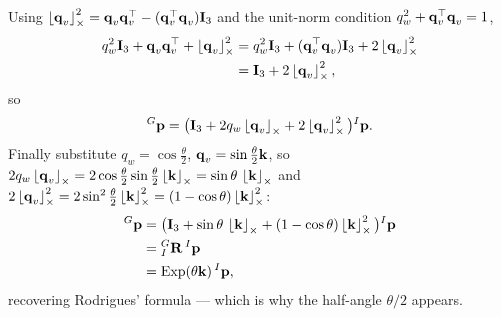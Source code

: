 Using $\skewsym{\vect{q}_v}^2 = \vect{q}_v\vect{q}_v\trans - (\vect{q}_v\trans\vect{q}_v)\vect{I}_3$ and the unit-norm condition $q_w^2 + \vect{q}_v\trans\vect{q}_v = 1$,
\begin{align}
q_w^2\vect{I}_3 + \vect{q}_v\vect{q}_v\trans + \skewsym{\vect{q}_v}^2
&= q_w^2\vect{I}_3 + (\vect{q}_v\trans\vect{q}_v)\vect{I}_3 + 2\skewsym{\vect{q}_v}^2 \\
&= \vect{I}_3 + 2\skewsym{\vect{q}_v}^2,
\end{align}
so
\begin{align}
{}^{G}\vect{p} = \big(\vect{I}_3 + 2q_w\skewsym{\vect{q}_v} + 2\skewsym{\vect{q}_v}^2\big){}^{I}\vect{p}.
\end{align}
Finally substitute $q_w = \cos\tfrac{\theta}{2}$, $\vect{q}_v = \sin\tfrac{\theta}{2}\vect{k}$, so $2q_w\skewsym{\vect{q}_v} = 2\cos\tfrac{\theta}{2}\sin\tfrac{\theta}{2}\skewsym{\vect{k}} = \sin\theta\,\skewsym{\vect{k}}$ and $2\skewsym{\vect{q}_v}^2 = 2\sin^2\tfrac{\theta}{2}\skewsym{\vect{k}}^2 = (1-\cos\theta)\skewsym{\vect{k}}^2$:
\begin{align}
{}^{G}\vect{p} &= \big(\vect{I}_3 + \sin\theta\,\skewsym{\vect{k}} + (1-\cos\theta)\skewsym{\vect{k}}^2\big){}^{I}\vect{p} \\
&= {}^{G}_{I}\vect{R}\,{}^{I}\vect{p} \\
&= \Exp(\theta\vect{k})\,{}^{I}\vect{p},
\end{align}
recovering Rodrigues' formula --- which is why the half-angle $\theta/2$ appears.

